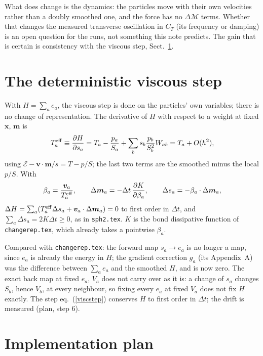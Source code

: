 \documentclass[11pt,aps,preprint,nofootinbib,superscriptaddress,tightenlines]{revtex4-2}
\def\st{\begin{equation}}
\def\stp{\end{equation}}
\def\Eq#1{eq.~(\ref{#1})}
\def\Sect#1{Sect.~\ref{#1}}
\begin{document}
What does change is the dynamics: the particles move with their own velocities
rather than a doubly smoothed one, and the force has no $\Delta\mathcal M$ terms.
Whether that changes the measured transverse oscillation in $C_T$ (its frequency
or damping) is an open question for the runs, not something this note predicts.
The gain that is certain is consistency with the viscous step, \Sect{sec:visc}.

\section{The deterministic viscous step}
\label{sec:visc}

With $H=\sum_ae_a$, the viscous step is done on the particles' own variables; there
is no change of representation.  The derivative of $H$ with respect to a weight at
fixed $\bm x$, $\bm m$ is
\st
T^{\rm eff}_a\equiv\frac{\partial H}{\partial s_a}
=T_a-\frac{p_a}{S_a}+\sum_bs_b\frac{p_b}{S_b^2}W_{ab}
=T_a+O(h^2),
\label{Teff}
\stp
using $\mathcal E-\bm v\cdot\bm m/s=T-p/S$; the last two terms are the smoothed minus
the local $p/S$.  With
\st
\beta_a=\frac{\bm v_a}{T^{\rm eff}_a},\qquad
\Delta\bm m_a=-\Delta t\,\frac{\partial K}{\partial\beta_a},\qquad
\Delta s_a=-\beta_a\cdot\Delta\bm m_a ,
\label{viscstep}
\stp
$\Delta H=\sum_a(T^{\rm eff}_a\Delta s_a+\bm v_a\cdot\Delta\bm m_a)=0$ to first order
in $\Delta t$, and $\sum_a\Delta s_a=2K\Delta t\ge0$, as in \texttt{sph2.tex}.  $K$ is
the bond dissipative function of \texttt{changerep.tex}, which already takes a
pointwise $\beta_a$.

Compared with \texttt{changerep.tex}: the forward map $s_a\to e_a$ is no longer a
map, since $e_a$ is already the energy in $H$; the gradient correction $g_a$
(its Appendix~A) was the difference between $\sum_ae_a$ and the smoothed $H$, and is
now zero.  The exact back map at fixed $e_a$, $V_a$ does not carry over as it is: a
change of $s_a$ changes $S_b$, hence $V_b$, at every neighbour, so fixing every
$e_a$ at fixed $V_a$ does not fix $H$ exactly.  The step \Eq{viscstep} conserves $H$
to first order in $\Delta t$; the drift is measured (plan, step 6).

\section{Implementation plan}
\label{sec:plan}
\end{document}
